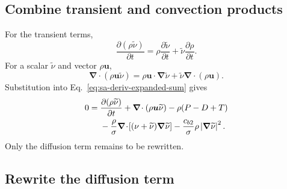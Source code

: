 \documentclass[11pt]{article}
\newcommand{\SAgrad}{\boldsymbol{\nabla}}
\newcommand{\SAdiv}{\boldsymbol{\nabla}\!\cdot}
\begin{document}
\subsection{Combine transient and convection products}

For the transient terms,
\begin{equation}
  \frac{\partial(\rho\widetilde{\nu})}{\partial t}
  =\rho\frac{\partial\widetilde{\nu}}{\partial t}
  +\widetilde{\nu}\frac{\partial\rho}{\partial t}.
  \label{eq:sa-deriv-transient-product}
\end{equation}
For a scalar \(\widetilde{\nu}\) and vector \(\rho\boldsymbol u\),
\begin{equation}
  \SAdiv(\rho\boldsymbol u\widetilde{\nu})
  =\rho\boldsymbol u\mathbin{\cdot}\SAgrad\widetilde{\nu}
  +\widetilde{\nu}\SAdiv(\rho\boldsymbol u).
  \label{eq:sa-deriv-convection-product}
\end{equation}
Substitution into Eq.~\eqref{eq:sa-deriv-expanded-sum} gives
\begin{align}
  0={}&
  \frac{\partial(\rho\widetilde{\nu})}{\partial t}
  +\SAdiv(\rho\boldsymbol u\widetilde{\nu})
  -\rho(P-D+T) \notag\\
  &-\frac{\rho}{\sigma}
   \SAdiv\!\left[(\nu+\widetilde{\nu})\SAgrad\widetilde{\nu}\right]
  -\frac{c_{b2}}{\sigma}\rho
   \left|\SAgrad\widetilde{\nu}\right|^2.
  \label{eq:sa-deriv-before-diffusion-rewrite}
\end{align}
Only the diffusion term remains to be rewritten.

\subsection{Rewrite the diffusion term}
\end{document}
